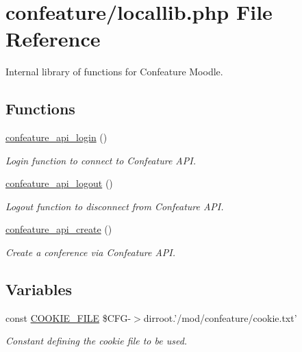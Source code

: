 \hypertarget{locallib_8php}{\section{confeature/locallib.php File Reference}
\label{locallib_8php}
}


Internal library of functions for Confeature Moodle.  


\subsection*{Functions}
\begin{DoxyCompactItemize}
\item 
\hyperlink{locallib_8php_a0034931acefd021a0147a0216bc0a6a8}{confeature\-\_\-api\-\_\-login} ()
\begin{DoxyCompactList}\small\item\em Login function to connect to Confeature A\-P\-I. \end{DoxyCompactList}\item 
\hyperlink{locallib_8php_a7acfa5bd6b3fa64681a044cfa5360652}{confeature\-\_\-api\-\_\-logout} ()
\begin{DoxyCompactList}\small\item\em Logout function to disconnect from Confeature A\-P\-I. \end{DoxyCompactList}\item 
\hyperlink{locallib_8php_a7dc79dc02ce145c489edd4734a207278}{confeature\-\_\-api\-\_\-create} ()
\begin{DoxyCompactList}\small\item\em Create a conference via Confeature A\-P\-I. \end{DoxyCompactList}\end{DoxyCompactItemize}
\subsection*{Variables}
\begin{DoxyCompactItemize}
\item 
const \hyperlink{locallib_8php_a30f006ca5997500742610df15bccc1a2}{C\-O\-O\-K\-I\-E\-\_\-\-F\-I\-L\-E} \$C\-F\-G-\/$>$dirroot.'/mod/confeature/cookie.\-txt'
\begin{DoxyCompactList}\small\item\em Constant defining the cookie file to be used. \end{DoxyCompactList}\end{DoxyCompactItemize}


